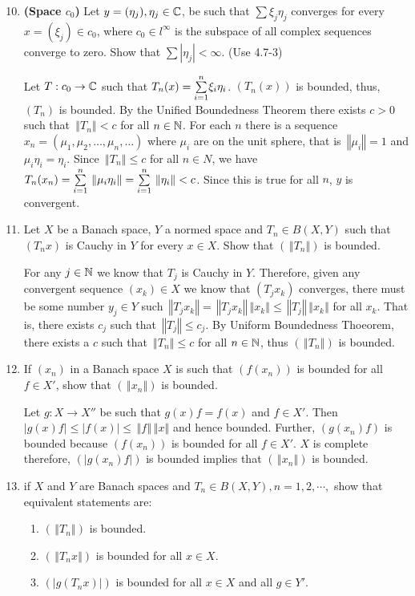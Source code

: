 \documentclass[10pt,a4paper]{report}
\newcommand{\NORM}[1]{\,\left \Vert #1 \right \Vert}
\begin{document}
\begin{enumerate}
	\setcounter{enumi}{9}
	\item \textbf{(Space $c_0$)}  Let $y=(\eta_j), \eta_j \in \mathbb{C}$, be such that $\sum  \xi_j\eta_j$ converges for every $x=(\xi_j)\in c_0$, where $c_0\in l^\infty$ is the subspace of all complex sequences converge to zero. Show that $\sum |\eta_j|< \infty$.  (Use 4.7-3)
	
	Let $T: c_0 \to \mathbb{C}$ such that $T_n(x) = \underset{i=1}{\overset{n}{\sum}} \xi_i \eta_i$.  $(T_n(x))$ is bounded, thus, $(T_n)$ is bounded.  By the Unified Boundedness Theorem there exists $c > 0$ such that $\NORM{T_n}<c$ for all $n \in \mathbb{N}$.  For each $n$ there is a sequence $x_n = (\mu_1, \mu_2, \dots, \mu_n, \dots)$ where $\mu_i$ are on the unit sphere, that is $\NORM{\mu_i}=1$ and $\mu_i\eta_i = \eta_i$.  Since $\NORM{T_n} \le c$ for all $n\in N$, we have $T_n(x_n) = \SUM{i=1}{n}\NORM{\mu_i\eta_i} = \SUM{i=1}{n}\NORM{\eta_i} < c$. Since this is true for all $n$,  $y$ is convergent.
	
	\item Let $X$ be a Banach space, $Y$ a normed space and $T_n\in B(X,Y)$ such that $(T_nx)$ is Cauchy in $Y$ for every $x \in X$.  Show that $(\NORM{T_n})$ is bounded.
	
	For any $j\in \mathbb{N}$ we know that $T_j$ is Cauchy in $Y$.  Therefore, given any convergent sequence $(x_k) \in X$ we know that $(T_j x_k)$ converges, there must be some number $y_j\in Y$ such $\NORM{T_j x_k} =  \NORM{T_j x_k} \NORM{x_k}\le\NORM{T_j} \NORM{x_k}$ for all $x_k$.  That is, there exists $c_j$ such that $\NORM{T_j} \le c_j$.  By Uniform Boundedness Thoeorem, there exists a $c$ such that $\NORM{T_n}\le c$ for all $n \in \mathbb{N}$, thus $(\NORM{T_n})$ is bounded.
	
	\setcounter{enumi}{12}
	\item  If $(x_n)$ in a Banach space $X$ is such that $(f(x_n))$ is bounded for all $ f\in X'$, show that $(\NORM{x_n})$ is bounded.

	Let $g: X \to X''$ be such that $g(x)f=f(x)$ and $f \in X'$. Then $|g(x)f| \le |f(x)| \le \NORM{f}\NORM{x}$ and hence bounded.  Further, $(g(x_n)f)$ is bounded because $(f(x_n))$ is bounded for all $f \in X'$.  $X$ is complete therefore, $(|g(x_n)f|)$ is bounded implies that $(\NORM{x_n})$ is bounded.
	
	\item if $X$ and $Y$ are Banach spaces and $T_n\in B(X,Y), n=1,2,\cdots,$ show that equivalent statements are:
	\begin{enumerate}
		\item $(\NORM{T_n})$ is bounded.
		\item $(\NORM{T_nx})$ is bounded for all $x \in X$.
		\item $(|g(T_nx)|)$ is bounded for all $x\in X$ and all $g \in Y'$.
	\end{enumerate}
	

\end{enumerate}
\end{document}
